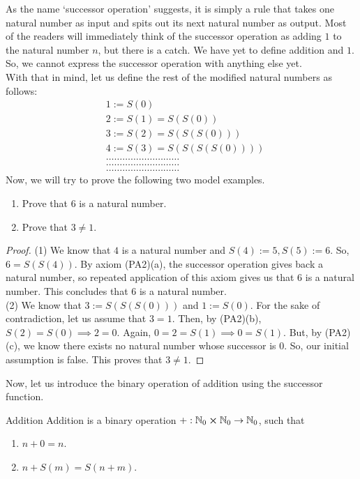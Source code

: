 \noindent As the name `successor operation' suggests, it is simply a rule that takes one natural number as input and spits out its next natural number as output. Most of the readers will immediately think of the successor operation as adding $1$ to the natural number $n$, but there is a catch. We have yet to define addition and $1$. So, we cannot express the successor operation with anything else yet.\\
With that in mind, let us define the rest of the modified natural numbers as follows:
\begin{align*}
	&1:=S(0) \\
	&2:=S(1)=S(S(0)) \\
	&3:=S(2)=S(S(S(0))) \\
	&4:=S(3)=S(S(S(S(0)))) \\
	&\dots\dots\dots\dots\dots\dots\dots\dots\dots \\
	&\dots\dots\dots\dots\dots\dots\dots\dots\dots \\
	&\dots\dots\dots\dots\dots\dots\dots\dots\dots
\end{align*}
Now, we will try to prove the following two model examples.
\begin{Example}
	\begin{enumerate}
		\item Prove that $6$ is a natural number.
		\item Prove that $3\neq1$.
	\end{enumerate}
\end{Example}
\begin{proof}
	(1) We know that $4$ is a natural number and $S(4):=5, S(5):=6$. So, $6=S(S(4))$. By axiom (PA2)(a), the successor operation gives back a natural number, so repeated application of this axiom gives us that $6$ is a natural number. This concludes that $6$ is a natural number.\\
	(2) We know that $3:=S(S(S(0)))$ and $1:=S(0)$. For the sake of contradiction, let us assume that $3=1$. Then, by (PA2)(b), $S(2)=S(0)\implies2=0$. Again, $0=2=S(1)\implies0=S(1)$. But, by (PA2)(c), we know there exists no natural number whose successor is $0$. So, our initial assumption is false. This proves that $3\neq 1$.
\end{proof}
\noindent Now, let us introduce the binary operation of addition using the successor function.
\begin{Definition}{Addition}\label{addition}
	Addition is a binary operation $+:\mathbb{N}_0\cross\mathbb{N}_0\to\mathbb{N}_0$, such that
	\begin{enumerate}
		\item $n+0=n$.
		\item $n+S(m)=S(n+m)$.
	\end{enumerate}
\end{Definition}
